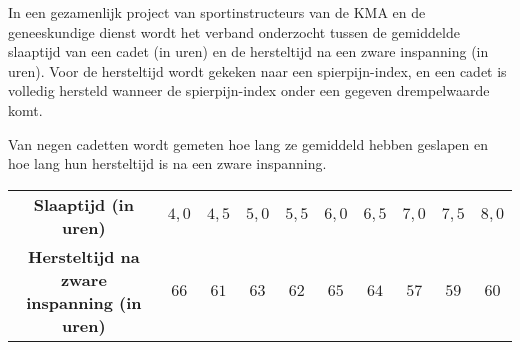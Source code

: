\begin{question}{30}{
    In een gezamenlijk project van sportinstructeurs van de KMA en de geneeskundige dienst wordt het verband onderzocht tussen de gemiddelde slaaptijd van een cadet (in uren) en de hersteltijd na een zware inspanning (in uren).
    Voor de hersteltijd wordt gekeken naar een spierpijn-index, en een cadet is volledig hersteld wanneer de spierpijn-index onder een gegeven drempelwaarde komt.

    Van negen cadetten wordt gemeten hoe lang ze gemiddeld hebben geslapen en hoe lang hun hersteltijd is na een zware inspanning.
    \begin{center}
        \begin{tabular}{c|ccccccccc}
            \toprule
                \textbf{Slaaptijd (in uren)} & $4,0$ & $4,5$ & $5,0$ & $5,5$ & $6,0$ & $6,5$ & $7,0$ & $7,5$ & $8,0$ \\
                \textbf{Hersteltijd na zware inspanning (in uren)} & $66$ & $61$ & $63$ & $62$ & $65$ & $64$ & $57$ & $59$ & $60$ \\
            \bottomrule
        \end{tabular}
    \end{center}
}


\end{question}
